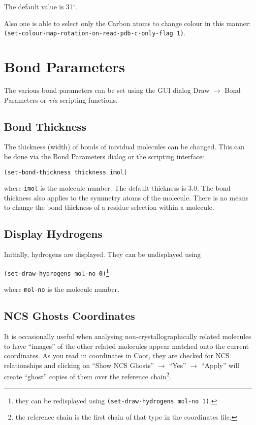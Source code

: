 \documentclass{book}
\begin{document}
The default value is 31$^\circ$.

Also one is able to select only the Carbon atoms to change colour in
this manner: \texttt{(set-colour-map-rotation-on-read-pdb-c-only-flag
  1)}.

\section{Bond Parameters}
The various bond parameters can be set using the GUI dialog
\textsf{Draw $\rightarrow$ Bond Parameters} or \emph{via} scripting
functions.

\subsection{Bond Thickness}
 The thickness (width) of
bonds of inividual molecules can be changed.  This can be done via the
\textsf{Bond Parameters} dialog or the scripting interface:

\texttt{(set-bond-thickness thickness imol)}

where \texttt{imol} is the molecule number. The default thickness is
3.0. The bond thickness also applies to the symmetry atoms of the
molecule.  There is no means to change the bond thickness of a residue
selection within a molecule.

\subsection{Display Hydrogens}
Initially, hydrogens are displayed.  They can be
undisplayed using 

\texttt{(set-draw-hydrogens mol-no 0)}\footnote{they
  can be redisplayed using \texttt{(set-draw-hydrogens mol-no 1)}.}

where \texttt{mol-no} is the molecule number.

\subsection{NCS Ghosts Coordinates}
It is occasionally useful when analysing
non-crystallographically related molecules to have ``images'' of the
other related molecules appear matched onto the current coordinates.
As you read in coordinates in Coot, they are checked for NCS
relationships and clicking on ``Show NCS Ghosts'' $\rightarrow$
``Yes'' $\rightarrow$ ``Apply'' will create ``ghost'' copies of them
over the reference chain\footnote{the reference chain is the first
  chain of that type in the coordinates file.}.
\end{document}

